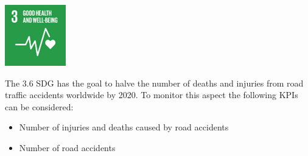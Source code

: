 \begin{minipage}[c]{0.2\textwidth}
    \includegraphics[width=\textwidth]{Images/Social_sustainability/3_helth.png}
\end{minipage}
\begin{minipage}[c]{0.8\textwidth}
    The 3.6 SDG has the goal to halve the number of deaths and injuries from road traffic accidents worldwide by 2020. To monitor this aspect the following KPIs can be considered:
\begin{itemize}
    \item Number of injuries and deaths caused by road accidents
    \item Number of road accidents
\end{itemize}
\end{minipage}
\hfill

